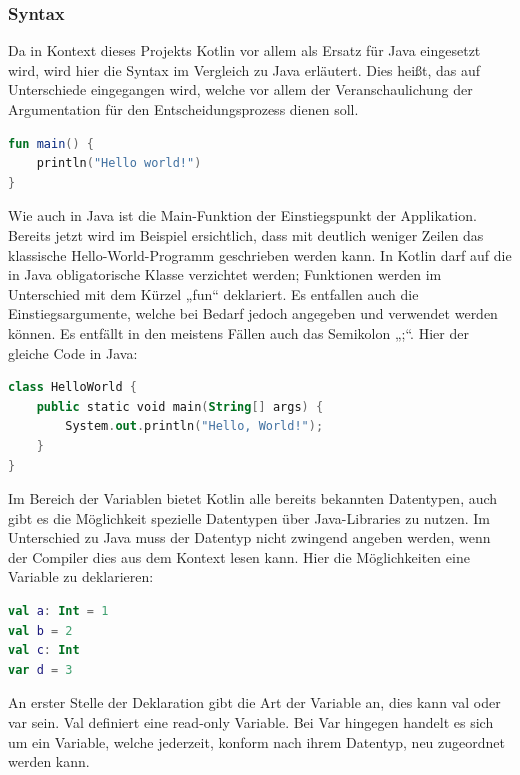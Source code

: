 \subsubsection{Syntax}
Da in Kontext dieses Projekts Kotlin vor allem als Ersatz für Java eingesetzt wird, wird hier die Syntax im Vergleich zu Java erläutert. Dies heißt, das auf Unterschiede eingegangen wird, welche vor allem der Veranschaulichung der Argumentation für den Entscheidungsprozess dienen soll.
\begin{lstlisting}[caption={Kotlin-Hello-World}, language=Kotlin]
fun main() {
    println("Hello world!")
}
\end{lstlisting}
\vspace{4mm}\par
Wie auch in Java ist die Main-Funktion der Einstiegspunkt der Applikation. Bereits jetzt wird im Beispiel ersichtlich, dass mit deutlich weniger Zeilen das klassische Hello-World-Programm geschrieben werden kann. In Kotlin darf auf die in Java obligatorische Klasse verzichtet werden; Funktionen werden im Unterschied mit dem Kürzel „fun“ deklariert. Es entfallen auch die Einstiegsargumente, welche bei Bedarf jedoch angegeben und verwendet werden können. Es entfällt in den meistens Fällen auch das Semikolon „;“. 
Hier der gleiche Code in Java:
\begin{lstlisting}[caption={Java-Hello-World}, language=Kotlin]
class HelloWorld {
    public static void main(String[] args) {
        System.out.println("Hello, World!"); 
    }
}
\end{lstlisting}
\vspace{4mm}\par
Im Bereich der Variablen bietet Kotlin alle bereits bekannten Datentypen, auch gibt es die Möglichkeit spezielle Datentypen über Java-Libraries zu nutzen. Im Unterschied zu Java muss der Datentyp nicht zwingend angeben werden, wenn der Compiler dies aus dem Kontext lesen kann. Hier die Möglichkeiten eine Variable zu deklarieren:
\vspace{3mm}\par
\newpage 
\begin{lstlisting}[caption={Val \& Var}, language=Kotlin]
val a: Int = 1
val b = 2
val c: Int 
var d = 3
\end{lstlisting}
\vspace{4mm}\par
An erster Stelle der Deklaration gibt die Art der Variable an, dies kann val oder var  sein. Val definiert eine read-only Variable. Bei Var hingegen handelt es sich um ein Variable, welche jederzeit, konform nach ihrem Datentyp, neu zugeordnet werden kann. 
